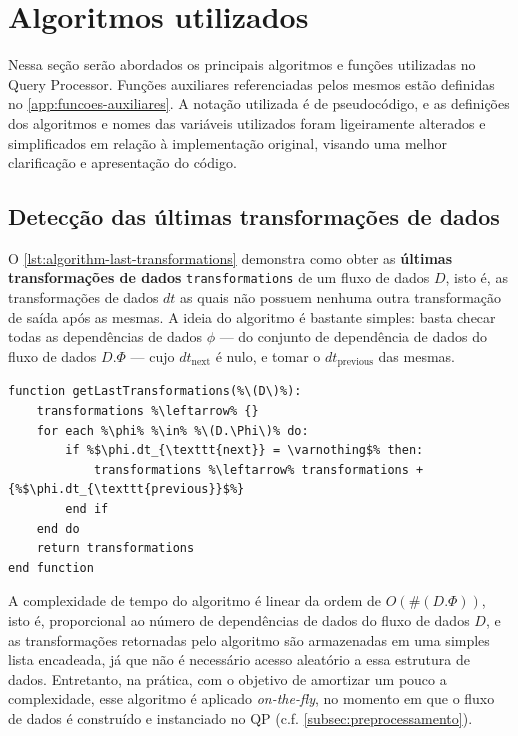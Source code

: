 \section{Algoritmos utilizados}%
\label{sec:algoritmos-utilizados}

Nessa seção serão abordados os principais algoritmos e funções utilizadas no Query Processor. Funções auxiliares referenciadas pelos mesmos estão definidas no \autoref{app:funcoes-auxiliares}. A notação utilizada é de pseudocódigo, e as definições dos algoritmos e nomes das variáveis utilizados foram ligeiramente alterados e simplificados em relação à implementação original, visando uma melhor clarificação e apresentação do código.


\subsection{Detecção das últimas transformações de dados}

O \autoref{lst:algorithm-last-transformations} demonstra como obter as \textbf{últimas transformações de dados} \texttt{transformations} de um fluxo de dados \( D \), isto é, as transformações de dados \(dt\) as quais não possuem nenhuma outra transformação de saída após as mesmas. A ideia do algoritmo é bastante simples: basta checar todas as dependências de dados \( \phi \) --- do conjunto de dependência de dados do fluxo de dados \( D.\Phi \) --- cujo \( dt_{\textrm{next}} \) é nulo, e tomar o \( dt_{\textrm{previous}} \) das mesmas.

\begin{minipage}[c]{0.95\textwidth}
\begin{lstlisting}[language=pseudocode,label={lst:algorithm-last-transformations},caption={[Detecção das últimas transformações de dados]Detecção das útimas transformações de dados em uma especificação de fluxo de dados.}]
function getLastTransformations(%\(D\)%):
    transformations %\leftarrow% {}
    for each %\phi% %\in% %\(D.\Phi\)% do:
        if %$\phi.dt_{\texttt{next}} = \varnothing$% then:
            transformations %\leftarrow% transformations + {%$\phi.dt_{\texttt{previous}}$%}
        end if
    end do
    return transformations
end function
\end{lstlisting}
\end{minipage}

A complexidade de tempo do algoritmo é linear da ordem de \( O(\#(D.\Phi)) \), isto é, proporcional ao número de dependências de dados do fluxo de dados \( D \), e as transformações retornadas pelo algoritmo são armazenadas em uma simples lista encadeada, já que não é necessário acesso aleatório a essa estrutura de dados. Entretanto, na prática, com o objetivo de amortizar um pouco a complexidade, esse algoritmo é aplicado \textit{on-the-fly}, no momento em que o fluxo de dados é construído e instanciado no QP (c.f. \autoref{subsec:preprocessamento}).


